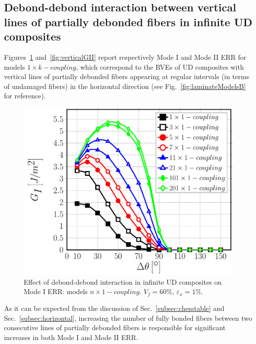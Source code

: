 \documentclass[smallextended]{svjour3}       %
\begin{document}
\subsection{Debond-debond interaction between vertical lines of partially debonded fibers in infinite UD composites}

Figures~\ref{fig:verticalGI} and~\ref{fig:verticalGII} report respectively Mode I and Mode II ERR for models $1\times k-coupling$, which correspond to the RVEs of UD composites with vertical lines of partially debonded fibers appearing at regular intervals (in terms of undamaged fibers) in the horizontal direction (see Fig.~\ref{fig:laminateModelsB} for reference). 

\begin{figure}[!h]
\centering
\includegraphics[width=\textwidth]{nx1-coupling-vf60-GI.pdf}
\caption{Effect of debond-debond interaction in infinite UD composites on Mode I ERR: models $n\times 1-coupling$. $V_{f}=60\%$, $\varepsilon_{x}=1\%$.}\label{fig:verticalGI}
\end{figure}

As it can be expected from the discussion of Sec.~\ref{subsec:chesstable} and Sec.~\ref{subsec:horizontal}, increasing the number of fully bonded fibers between two consecutive lines of partially debonded fibers is responsible for significant increases in both Mode I and Mode II ERR.
\end{document}
